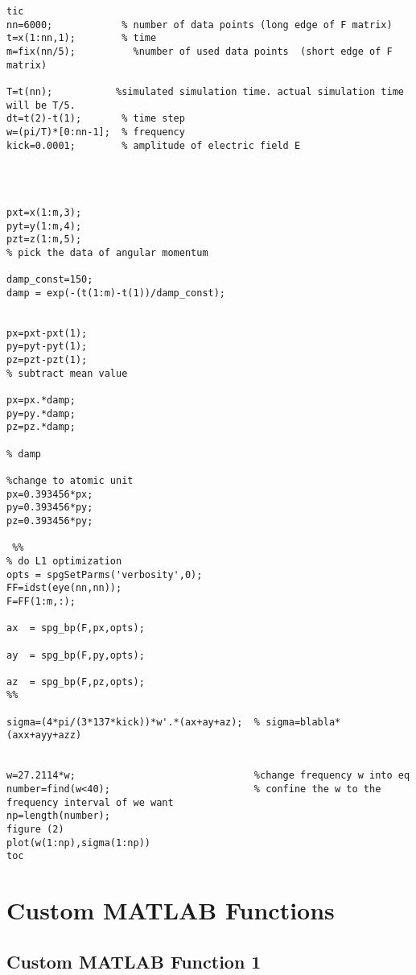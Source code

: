 \documentclass[11pt]{article}
\begin{document}
\begin{appendices}
\begin{verbatim}
tic
nn=6000;            % number of data points (long edge of F matrix)
t=x(1:nn,1);        % time
m=fix(nn/5);          %number of used data points  (short edge of F matrix)

T=t(nn);           %simulated simulation time. actual simulation time will be T/5.
dt=t(2)-t(1);       % time step
w=(pi/T)*[0:nn-1];  % frequency
kick=0.0001;        % amplitude of electric field E 

 

 
pxt=x(1:m,3);       
pyt=y(1:m,4);
pzt=z(1:m,5);
% pick the data of angular momentum
 
damp_const=150;
damp = exp(-(t(1:m)-t(1))/damp_const);

 
px=pxt-pxt(1);
py=pyt-pyt(1);
pz=pzt-pzt(1);
% subtract mean value

px=px.*damp;
py=py.*damp;
pz=pz.*damp;

% damp

%change to atomic unit
px=0.393456*px;
py=0.393456*py;
pz=0.393456*py;

 %% 
% do L1 optimization
opts = spgSetParms('verbosity',0); 
FF=idst(eye(nn,nn));
F=FF(1:m,:);
 
ax  = spg_bp(F,px,opts); 

ay  = spg_bp(F,py,opts); 

az  = spg_bp(F,pz,opts); 
%%
 
sigma=(4*pi/(3*137*kick))*w'.*(ax+ay+az);  % sigma=blabla*(axx+ayy+azz)

 
w=27.2114*w;                               %change frequency w into eq
number=find(w<40);                         % confine the w to the frequency interval of we want
np=length(number);                         
figure (2)
plot(w(1:np),sigma(1:np))
toc
\end{verbatim}

\section{Custom MATLAB Functions} 	%

\subsection*{Custom MATLAB Function 1}


\end{appendices}
\end{document}
